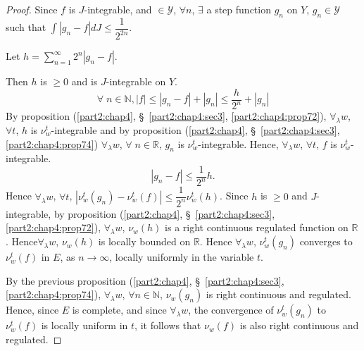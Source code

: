 \begin{proof}
Since $f$ is $J$-integrable, and $\in \mathscr{Y}$, $\forall n$,
$\exists$ a step function $g_n$ on $Y$, $g_n \in \mathscr{Y}$ such
that $\int |g_n -f| d J \leq \dfrac{1}{2^{2n}}$.

Let $h = \sum\limits^\infty_{n=1} 2^n |g_n -f|$. 

Then $h$ is $\geq 0$ and is $J$-integrable on $Y$. 
$$
\forall \;n \in \mathbb{N}, |f| \leq |g_n -f| + |g_n| \leq
\frac{h}{2^n} + |g_n|
$$
By proposition (\ref{part2:chap4}, \S\ \ref{part2:chap4:sec3},
\ref{part2:chap4:prop72}), $\forall_\lambda w$, $\forall t$, $h$ 
is $\nu^t_w$-integrable and by proposition (\ref{part2:chap4},
\S\ \ref{part2:chap4:sec3}, \ref{part2:chap4:prop74}) 
$\forall_\lambda w$, $\forall \; n \in\mathbb{R}$, $g_n$ is
$\nu^t_w$-integrable. Hence, $\forall_\lambda w$, $\forall t$, $f$ is
$\nu^t_w$-integrable. 
$$
|g_n -f| \leq \frac{1}{2^n} h. 
$$
Hence $\forall_\lambda w$, $\forall t$, $|\nu^t_w (g_n) - \nu^t_w(f)|
\leq \dfrac{1}{2^n} \nu^t_w(h)$. Since $h$ is $\geq 0$ and
$J$-integrable, by proposition (\ref{part2:chap4},
\S\ \ref{part2:chap4:sec3}, \ref{part2:chap4:prop72}),
$\forall_\lambda w$, 
$\nu_w(h)$ is a right continuous regulated function on
$\mathbb{R}$. Hence\pageoriginale $\forall_\lambda w$, $\nu_w(h)$ is locally bounded
on $\mathbb{R}$. Hence $\forall_\lambda w$, $\nu^t_w(g_n)$  converges
to $\nu^t_w(f)$ in $E$, as $n \to \infty$, locally uniformly in the
variable $t$. 

By the previous proposition (\ref{part2:chap4},
\S\ \ref{part2:chap4:sec3}, \ref{part2:chap4:prop74}),
$\forall_\lambda w$, 
$\forall n \in \mathbb{N}$, $\nu_w (g_n)$ is right continuous and
regulated. Hence, since $E$ is complete, and  since $\forall_\lambda
w$, the convergence of $\nu^t_w(g_n)$ to $\nu^t_w(f)$ is locally
uniform in $t$, it follows that $\nu_w(f)$ is also right continuous
and regulated. 
\end{proof}


